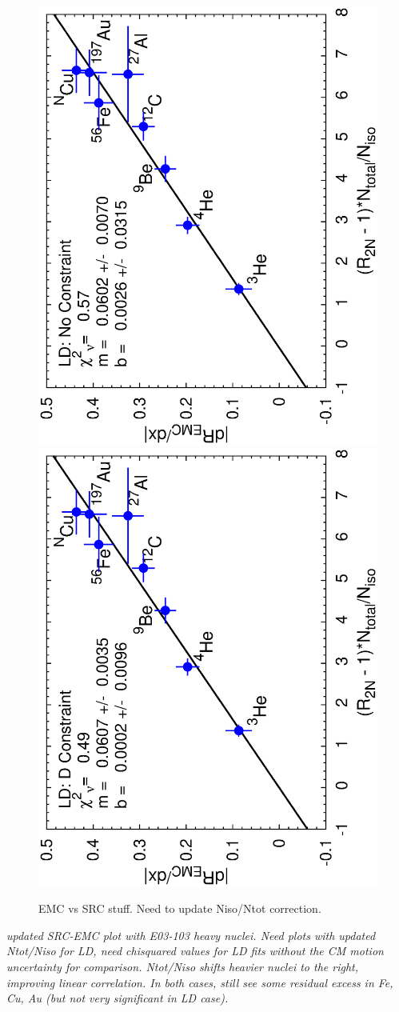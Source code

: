 \begin{figure}[htbp]
\begin{center}
\includegraphics[angle=-90,width=.46\textwidth]{plots/plotfit_all_nzaam1_xaxis_xyerr_rean_final_lp.eps}
\includegraphics[angle=-90,width=.46\textwidth]{plots/plotfit_all_nzaam1_xaxis_xyerr_rean_deut_final_lp.eps}
\caption{EMC vs SRC stuff.  Need to update Niso/Ntot correction.}
\label{emc_vs_src2}
\end{center}
\end{figure}

\textit{updated SRC-EMC plot with E03-103 heavy nuclei.  Need plots with
updated Ntot/Niso for LD, need chisquared values for LD fits without the
CM motion uncertainty for comparison.  Ntot/Niso shifts heavier nuclei to
the right, improving linear correlation.  In both cases, still see some
residual excess in Fe, Cu, Au (but not very significant in LD case).}

